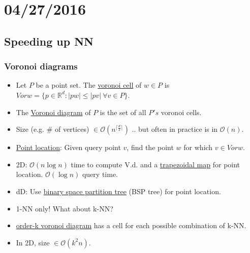 \documentclass[10pt]{article}
\newcommand{\bigo}{\mathcal{O}}
\newcommand{\R}{\mathbb{R}}
\begin{document}
\section*{04/27/2016}
\subsection*{Speeding up NN}
\subsubsection*{Voronoi diagrams}
	\begin{itemize}
		\item Let $P$ be a point set. The \underline{voronoi cell} of $w \in P$ is $Vor w = \{p \in \R^{d}: |pw| \leq |pv| \ \forall v \in P\}$.
		\item The \underline{Voronoi diagram} of $P$ is the set of all $P's$ voronoi cells.
		\item Size (e.g. \# of vertices) $\in \bigo(n^{\lceil \frac{d}{2}\rceil})$ .. but often in practice is in $\bigo(n)$.
		\item \underline{Point location}: Given query point $v$, find the point $w$ for which $v \in Vor w$.
		\item 2D: $\bigo(n\log n)$ time to compute V.d. and a \underline{trapezoidal map} for point location. $\bigo(\log n)$ query time.
		\item dD: Use \underline{binary space partition tree} (BSP tree) for point location.
		\item 1-NN only! What about k-NN?
		\item \underline{order-k voronoi diagram} has a cell for each possible combination of k-NN.
		\item In 2D, size $\in \bigo(k^{2}n)$.
	\end{itemize}
\end{document}
